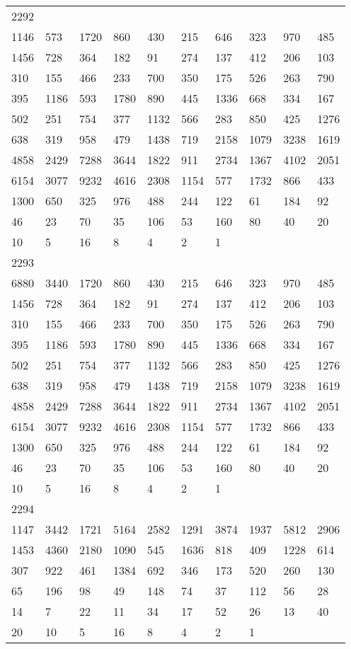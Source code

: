 \begin{longtable}{*{10}{l}}
2292&&&&&&&&&\\
1146& 573& 1720& 860& 430& 215& 646& 323& 970& 485\\
1456& 728& 364& 182& 91& 274& 137& 412& 206& 103\\
310& 155& 466& 233& 700& 350& 175& 526& 263& 790\\
395& 1186& 593& 1780& 890& 445& 1336& 668& 334& 167\\
502& 251& 754& 377& 1132& 566& 283& 850& 425& 1276\\
638& 319& 958& 479& 1438& 719& 2158& 1079& 3238& 1619\\
4858& 2429& 7288& 3644& 1822& 911& 2734& 1367& 4102& 2051\\
6154& 3077& 9232& 4616& 2308& 1154& 577& 1732& 866& 433\\
1300& 650& 325& 976& 488& 244& 122& 61& 184& 92\\
46& 23& 70& 35& 106& 53& 160& 80& 40& 20\\
10& 5& 16& 8& 4& 2& 1& \\

2293&&&&&&&&&\\
6880& 3440& 1720& 860& 430& 215& 646& 323& 970& 485\\
1456& 728& 364& 182& 91& 274& 137& 412& 206& 103\\
310& 155& 466& 233& 700& 350& 175& 526& 263& 790\\
395& 1186& 593& 1780& 890& 445& 1336& 668& 334& 167\\
502& 251& 754& 377& 1132& 566& 283& 850& 425& 1276\\
638& 319& 958& 479& 1438& 719& 2158& 1079& 3238& 1619\\
4858& 2429& 7288& 3644& 1822& 911& 2734& 1367& 4102& 2051\\
6154& 3077& 9232& 4616& 2308& 1154& 577& 1732& 866& 433\\
1300& 650& 325& 976& 488& 244& 122& 61& 184& 92\\
46& 23& 70& 35& 106& 53& 160& 80& 40& 20\\
10& 5& 16& 8& 4& 2& 1& \\

2294&&&&&&&&&\\
1147& 3442& 1721& 5164& 2582& 1291& 3874& 1937& 5812& 2906\\
1453& 4360& 2180& 1090& 545& 1636& 818& 409& 1228& 614\\
307& 922& 461& 1384& 692& 346& 173& 520& 260& 130\\
65& 196& 98& 49& 148& 74& 37& 112& 56& 28\\
14& 7& 22& 11& 34& 17& 52& 26& 13& 40\\
20& 10& 5& 16& 8& 4& 2& 1& \\


\end{longtable}
